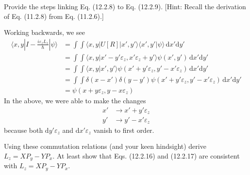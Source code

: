 \documentclass[../principles-of-quantum-mechanics.tex]{subfiles}
\begin{document}
\begin{questions}
	\question Provide the steps linking Eq. (12.2.8) to Eq. (12.2.9). [Hint: Recall the derivation of Eq. (11.2.8) from Eq. (11.2.6).]
	\begin{solution}
		Working backwards, we see
		\begin{align*}
			\langle x, y|I - \frac{i\varepsilon_z L_z}{\hbar}|\psi\rangle &= \int\!\!\!\!\int\langle x, y|U[R]|x', y'\rangle\langle x', y'|\psi\rangle \,\mathrm{d}x'\mathrm{d}y' \\
			&= \int\!\!\!\!\int \langle x, y|x' - y'\varepsilon_z, x'\varepsilon_z + y'\rangle \psi(x', y')\,\mathrm{d}x'\mathrm{d}y' \\
			&= \int\!\!\!\!\int \langle x, y|x', y'\rangle \psi(x' + y'\varepsilon_z, y' - x'\varepsilon_z)\,\mathrm{d}x'\mathrm{d}y' \\
			&= \int\!\!\!\!\int\delta(x - x')\delta(y - y')\psi(x' + y'\varepsilon_z, y' - x'\varepsilon_z)\,\mathrm{d}x'\mathrm{d}y' \\
			&= \psi(x + y\varepsilon_z, y - x\varepsilon_z)
		\end{align*}
		In the above, we were able to make the changes
		\begin{align*}
			x' &\to x' + y'\varepsilon_z \\
			y' &\to y' - x'\varepsilon_z
		\end{align*}
		because both $\mathrm{d}y'\varepsilon_z$ and $\mathrm{d}x'\varepsilon_z$ vanish to first order.
	\end{solution}

	\question Using these commutation relations (and your keen hindsight) derive $L_z = XP_y - YP_x$. At least show that Eqs. (12.2.16) and (12.2.17) are consistent with $L_z = XP_y - YP_x$.
	

\end{questions}
\end{document}
